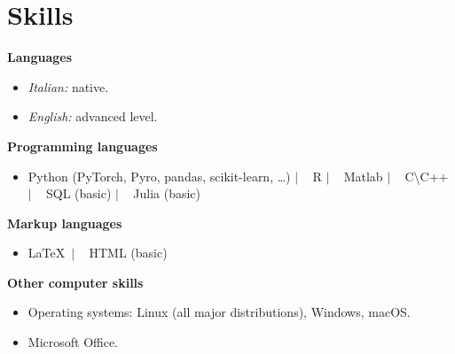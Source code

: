 \documentclass[a4paper, 11pt]{article}
\newcommand{\cvskills}[1]{
			\begin{itemize}[leftmargin = 0cm, label = {}]
				\small{\item{
					#1
				}}
			\end{itemize}
		}
\newcommand{\cvsep}{\kern2pt$|$\kern2pt \ }
\begin{document}
	\section{Skills}
		\cvskills{%
			\textbf{Languages}
				\begin{itemize}[noitemsep, topsep = -2pt]
					\item \textit{Italian:} native.
					\item \textit{English:} advanced level.
				\end{itemize}
			\textbf{Programming languages}
				\begin{itemize}[noitemsep, topsep = -2pt]
					\item
						Python (PyTorch, Pyro, pandas, scikit-learn, \dots) \cvsep
						R \cvsep
						Matlab \cvsep
						C\textbackslash C++ \cvsep
						SQL (basic) \cvsep
						Julia (basic)
				\end{itemize}
			\textbf{Markup languages}
				\begin{itemize}[noitemsep, topsep = -2pt]
					\item
						\LaTeX \ \cvsep
						HTML (basic)
				\end{itemize}
			\textbf{Other computer skills}
				\begin{itemize}[noitemsep, topsep = -2pt]
					\item Operating systems: Linux (all major distributions), Windows, macOS.
					\item Microsoft Office.
				\end{itemize}				
		}
\end{document}
